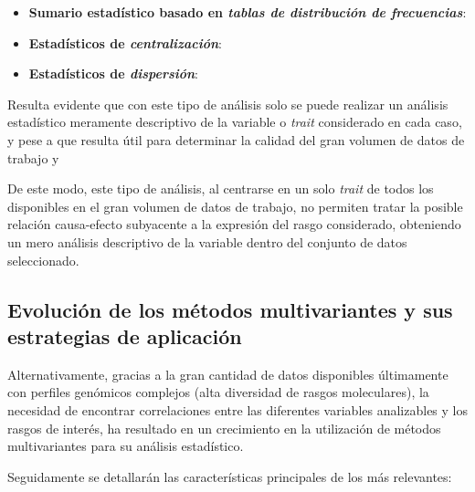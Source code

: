 \documentclass[IB,BIB]{TFUOC}%
\begin{document}
\footnotesize

\begin{itemize}
    \item \textbf{Sumario estadístico basado en  \textit{tablas de distribución de frecuencias}}:
    \item \textbf{Estadísticos de \textit{centralización}}:
    \item \textbf{Estadísticos de \textit{dispersión}}:
\end{itemize}

\normalsize

Resulta evidente que con este tipo de análisis solo se puede realizar un análisis estadístico meramente descriptivo de la variable o \textit{trait} considerado en cada caso, y pese a que resulta útil para determinar la calidad del gran volumen de datos de trabajo y

De este modo, este tipo de análisis, al centrarse en un solo \textit{trait} de todos los disponibles en el gran volumen de datos de trabajo, no permiten tratar la posible relación causa-efecto subyacente a la expresión del rasgo considerado, obteniendo un mero análisis descriptivo de la variable dentro del conjunto de datos seleccionado.


\subsection{Evolución de los métodos multivariantes y sus estrategias de aplicación}
\label{sec:Evolución de los métodos multivariantes y sus estrategias de aplicación}

Alternativamente, gracias a la gran cantidad de datos disponibles últimamente con perfiles genómicos complejos (alta diversidad de rasgos moleculares), la necesidad de encontrar correlaciones entre las diferentes variables analizables y los rasgos de interés, ha resultado en un crecimiento en la utilización de métodos multivariantes para su análisis estadístico.

Seguidamente se detallarán las características principales de los más relevantes:
\end{document}
